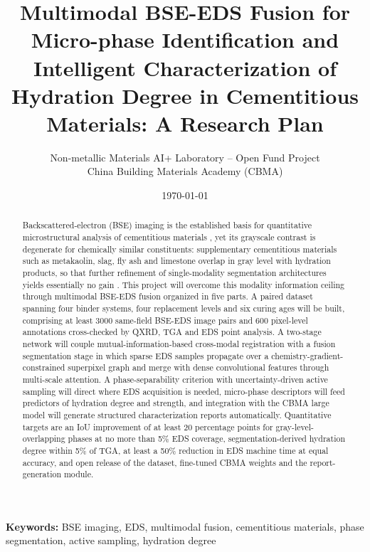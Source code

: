 \documentclass[11pt,a4paper]{article}
\title{Multimodal BSE-EDS Fusion for Micro-phase Identification and Intelligent Characterization of Hydration Degree in Cementitious Materials: A Research Plan}
\author{Non-metallic Materials AI+ Laboratory -- Open Fund Project\\ \small China Building Materials Academy (CBMA)}
\date{\today}
\begin{document}
\maketitle

\begin{abstract}
Backscattered-electron (BSE) imaging is the established basis for quantitative microstructural analysis of cementitious materials \citep{scrivener2004}, yet its grayscale contrast is degenerate for chemically similar constituents: supplementary cementitious materials such as metakaolin, slag, fly ash and limestone overlap in gray level with hydration products, so that further refinement of single-modality segmentation architectures yields essentially no gain \citep{lothenbach2011,juenger2015}. This project will overcome this modality information ceiling through multimodal BSE-EDS fusion organized in five parts. A paired dataset spanning four binder systems, four replacement levels and six curing ages will be built, comprising at least 3000 same-field BSE-EDS image pairs and 600 pixel-level annotations cross-checked by QXRD, TGA and EDS point analysis. A two-stage network will couple mutual-information-based cross-modal registration \citep{maes1997} with a fusion segmentation stage in which sparse EDS samples propagate over a chemistry-gradient-constrained superpixel graph \citep{achanta2012} and merge with dense convolutional features \citep{ronneberger2015} through multi-scale attention. A phase-separability criterion with uncertainty-driven active sampling will direct where EDS acquisition is needed, micro-phase descriptors will feed predictors of hydration degree and strength, and integration with the CBMA large model will generate structured characterization reports automatically. Quantitative targets are an IoU improvement of at least 20 percentage points for gray-level-overlapping phases at no more than 5\% EDS coverage, segmentation-derived hydration degree within 5\% of TGA, at least a 50\% reduction in EDS machine time at equal accuracy, and open release of the dataset, fine-tuned CBMA weights and the report-generation module.
\end{abstract}

\medskip
\noindent\textbf{Keywords:} BSE imaging, EDS, multimodal fusion, cementitious materials, phase segmentation, active sampling, hydration degree

\begin{center}\end{center}
\end{document}
